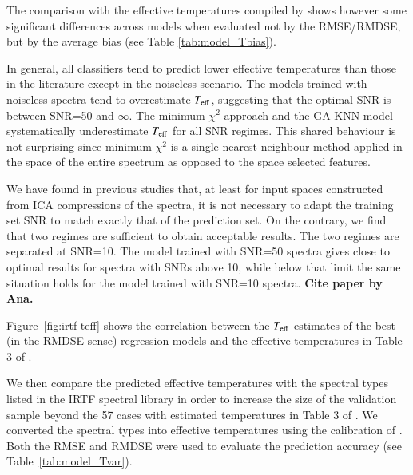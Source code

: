 The comparison with the effective temperatures compiled by
\cite{cesetti} shows however some significant differences across
models when evaluated not by the RMSE/RMDSE, but by the average bias
(see Table \ref{tab:model_Tbias}). 

In general, all classifiers tend to predict lower effective
temperatures than those in the literature except in the noiseless
scenario. The models trained with noiseless spectra tend to
overestimate $T_{\rm eff}$, suggesting that the optimal SNR is between
SNR=50 and $\infty$. The minimum-$\chi^2$ approach and the GA-KNN
model systematically underestimate $T_{\rm eff}$ for all SNR
regimes. This shared behaviour is not surprising since minimum
$\chi^2$ is a single nearest neighbour method applied in the space of
the entire spectrum as opposed to the space selected features.

We have found in previous studies that, at least for input spaces
constructed from ICA compressions of the spectra, it is not necessary
to adapt the training set SNR to match exactly that of the prediction
set. On the contrary, we find that two regimes are sufficient to
obtain acceptable results. The two regimes are separated at
SNR=10. The model trained with SNR=50 spectra gives close to optimal
results for spectra with SNRs above 10, while below that limit the
same situation holds for the model trained with SNR=10 spectra. {\bf
  Cite paper by Ana.}

Figure~\ref{fig:irtf-teff} shows the correlation between the $T_{\rm
eff}$ estimates of the best (in the RMDSE sense) regression models and
the effective temperatures in Table 3 of \cite{cesetti}. 

 

We then compare the predicted effective temperatures with the spectral
types listed in the IRTF spectral library in order to increase the
size of the validation sample beyond the 57 cases with estimated
temperatures in Table 3 of \cite{cesetti}. We converted the spectral
types into effective temperatures using the calibration of
\cite{2009ApJ...702..154S}. Both the RMSE and RMDSE were used to
evaluate the prediction accuracy (see Table~\ref{tab:model_Tvar}).

